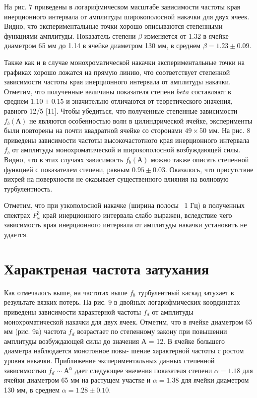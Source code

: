 На рис. 7 приведены в логарифмическом масштабе зависимости частоты края инерционного интервала от амплитуды широкополосной накачки для двух ячеек. Видно, что экспериментальные точки хорошо описываются степенными функциями амплитуды. Показатель степени $\beta$ изменяется от 1.32 в ячейке диаметром 65 мм до 1.14 в ячейке диаметром 130 мм, в среднем $\beta = 1.23 \pm 0.09$.

Также как и в случае монохроматической накачки экспериментальные точки на графиках хорошо ложатся на прямую линию, что соответствует степенной зависимости частоты края инерционного интервала от амплитуды накачки. Отметим, что полученные величины показателя степени $beta$ составляют в среднем $1.10 \pm 0.15$ и значительно отличаются от теоретического значения, равного 12/5 [11].
Чтобы убедиться, что полученные степенные зависимости $f_b(А)$ не являются особенностью волн в цилиндрической 
ячейке, эксперименты были повторены на почти квадратной ячейке со сторонами $49 \times 50$ мм. На рис. 8 приведены зависимости частоты высокочастотного края инерционного интервала $f_b$ от амплитуды монохроматической и широкополосной возбуждающей силы. Видно, что в этих случаях зависимость $f_b(А)$ можно также описать степенной функцией с показателем степени, равным $0.95 \pm 0.03$. Оказалось, что присутствие вихрей на поверхности не оказывает существенного влияния на волновую турбулентность.

Отметим, что при узкополосной накачке (ширина полосы ~1 Гц) в полученных спектрах $P^2_\omega$ край инерционного интервала слабо выражен, вследствие чего зависимость края инерционного интервала от амплитуды накачки установить не удается.

\section{Характреная частота затухания} \label{sect2_3}
Как отмечалось выше, на частотах выше $f_b$ турбулентный каскад затухает в результате вязких потерь. На рис. 9 в двойных логарифмических координатах приведены зависимости характерной частоты $f_d$ от амплитуды монохроматической накачки для двух ячеек. Отметим, что в ячейке диаметром 65 мм (рис. 9а) частота $f_d$ возрастает по степенному закону при повышении амплитуды возбуждающей силы до значения А = 12. В ячейке большего диаметра наблюдается монотонное повы- шение характерной частоты с ростом уровня накачки. Приближение экспериментальных данных степенной зависимостью $f_d \sim А^\alpha$ дает следующее значения показателя степени $\alpha = 1.18$ для ячейки диаметром 65 мм на растущем участке и $\alpha = 1.38$ для ячейки диаметром 130 мм, в среднем $\alpha = 1.28 \pm 0.10$.

